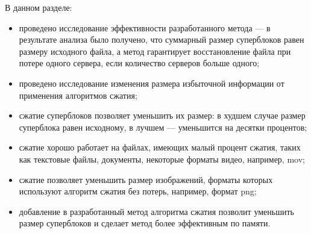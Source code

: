 \begin{flushleft}
В данном разделе:
\end{flushleft}
\begin{itemize}
\item проведено исследование эффективности разработанного метода --- в результате анализа было получено, что суммарный размер суперблоков равен размеру исходного файла, а метод гарантирует восстановление файла при потере одного сервера, если количество серверов больше одного;
\item проведено исследование изменения размера избыточной информации от применения алгоритмов сжатия;
\item сжатие суперблоков позволяет уменьшить их размер: в худшем случае размер суперблока равен исходному, в лучшем --- уменьшится на десятки процентов;
\item сжатие хорошо работает на файлах, имеющих малый процент сжатия, таких как текстовые файлы, документы, некоторые форматы видео, например, mov;
\item сжатие позволяет уменьшить размер изображений, форматы которых используют алгоритм сжатия без потерь, например, формат png;
\item добавление в разработанный метод алгоритма сжатия позволит уменьшить размер суперблоков и сделает метод более эффективным по памяти. 
\end{itemize}

